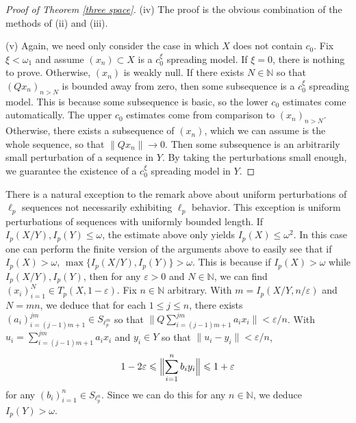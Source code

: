 \documentclass[12pt]{amsart}
\theoremstyle{definition}
\newcommand{\nn}{\mathbb{N}}
\begin{document}
\begin{proof}[Proof of Theorem \ref{three space}]
(iv) The proof is the obvious combination of the methods of (ii) and (iii).  



(v) Again, we need only consider the case in which $X$ does not contain $c_0$.  Fix $\xi<\omega_1$ and assume $(x_n)\subset X$ is a $c_0^\xi$ spreading model.  If $\xi=0$, there is nothing to prove.  Otherwise, $(x_n)$ is weakly null.  If there exists $N\in \nn$ so that $(Qx_n)_{n>N}$ is bounded away from zero, then some subsequence is a $c_0^\xi$ spreading model.  This is because some subsequence is basic, so the lower $c_0$ estimates come automatically.  The upper $c_0$ estimates come from comparison to $(x_n)_{n>N}$.  Otherwise, there exists a subsequence of $(x_n)$, which we can assume is the whole sequence, so that $\|Qx_n\|\to 0$.  Then some subsequence is an arbitrarily small perturbation of a sequence in $Y$.  By taking the perturbations small enough, we guarantee the existence of a $c_0^\xi$ spreading model in $Y$.  






\end{proof}


There is a natural exception to the remark above about uniform perturbations of $\ell_p$ sequences not necessarily exhibiting $\ell_p$ behavior.  This exception is uniform perturbations of sequences with uniformly bounded length. If $I_p(X/Y), I_p(Y)\leqslant \omega$, the estimate above only yields $I_p(X)\leqslant \omega^2$.    In this case one can perform the finite version of the arguments above to easily see that if $I_p(X)>\omega$, $\max\{I_p(X/Y), I_p(Y)\}>\omega$.   This is because if $I_p(X)>\omega$ while $I_p(X/Y), I_p(Y)$, then for any $\varepsilon>0$ and $N\in \nn$, we can find $(x_i)_{i=1}^N\in T_p(X, 1-\varepsilon)$. Fix $n\in \nn$ arbitrary.  With $m= I_p(X/Y, n/\varepsilon)$ and $N=mn$, we deduce that for each $1\leqslant j\leqslant n$, there exists $(a_i)_{i=(j-1)m+1}^{jm}\in S_{\ell_p^m}$ so that $\|Q\sum_{i=(j-1)m+1}^{jm} a_ix_i\|<\varepsilon/n$.  With $u_i=\sum_{i=(j-1)m+1}^{jm}a_ix_i$ and $y_i\in Y$ so that $\|u_i- y_i\|<\varepsilon/n$, $$1-2\varepsilon \leqslant \Bigl\|\sum_{i=1}^n b_iy_i\Bigr\|\leqslant 1+\varepsilon$$ for any $(b_i)_{i=1}^n \in S_{\ell_p^n}$.  Since we can do this for any $n\in \nn$, we deduce $I_p(Y)>\omega$.  
\end{document}

